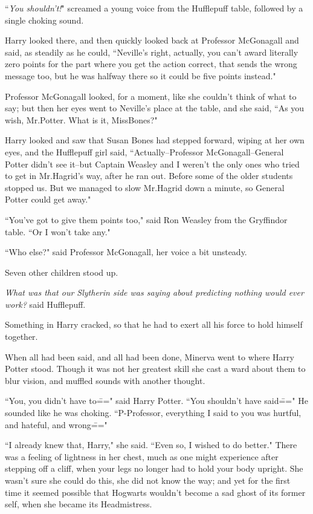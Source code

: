 ``\emph{You shouldn't!}" screamed a young voice from the Hufflepuff table, followed by a single choking sound.

Harry looked there, and then quickly looked back at Professor McGonagall and said, as steadily as he could, ``Neville's right, actually, you can't award literally zero points for the part where you get the action correct, that sends the wrong message too, but he was halfway there so it could be five points instead."

Professor McGonagall looked, for a moment, like she couldn't think of what to say; but then her eyes went to Neville's place at the table, and she said, ``As you wish, Mr.\?Potter. What is it, Miss\?Bones?"

Harry looked and saw that Susan Bones had stepped forward, wiping at her own eyes, and the Hufflepuff girl said, ``Actually\---Professor McGonagall\---General Potter didn't see it\---but Captain Weasley and I weren't the only ones who tried to get in Mr.\?Hagrid's way, after he ran out. Before some of the older students stopped us. But we managed to slow Mr.\?Hagrid down a minute, so General Potter could get away."

``You've got to give them points too," said Ron Weasley from the Gryffindor table. ``Or I won't take any."

``Who else?" said Professor McGonagall, her voice a bit unsteady.

Seven other children stood up.

\emph{What was that our Slytherin side was saying about predicting nothing would ever work?} said Hufflepuff.

Something in Harry cracked, so that he had to exert all his force to hold himself together.

\later

When all had been said, and all had been done, Minerva went to where Harry Potter stood. Though it was not her greatest skill she cast a ward about them to blur vision, and muffled sounds with another thought.

``You, you didn't have to\===" said Harry Potter. ``You shouldn't have said\===" He sounded like he was choking. ``P-Professor, everything I said to you was hurtful, and hateful, and wrong\==="

``I already knew that, Harry," she said. ``Even so, I wished to do better." There was a feeling of lightness in her chest, much as one might experience after stepping off a cliff, when your legs no longer had to hold your body upright. She wasn't sure she could do this, she did not know the way; and yet for the first time it seemed possible that Hogwarts wouldn't become a sad ghost of its former self, when she became its Headmistress.


